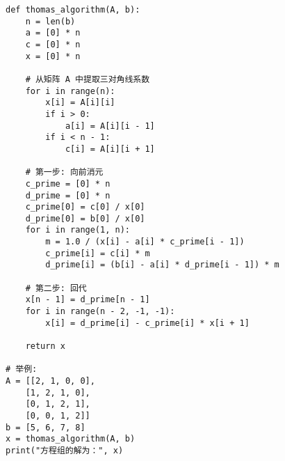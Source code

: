 \documentclass[UTF8,ctexart,a4paper,11pt,openany]{article}
\theoremstyle{definition}
\begin{document}
\begin{lstlisting}[aboveskip=0pt]
def thomas_algorithm(A, b):
    n = len(b)
    a = [0] * n
    c = [0] * n
    x = [0] * n

    # 从矩阵 A 中提取三对角线系数
    for i in range(n):
        x[i] = A[i][i]
        if i > 0:
            a[i] = A[i][i - 1]
        if i < n - 1:
            c[i] = A[i][i + 1]

    # 第一步: 向前消元
    c_prime = [0] * n
    d_prime = [0] * n
    c_prime[0] = c[0] / x[0]
    d_prime[0] = b[0] / x[0]
    for i in range(1, n):
        m = 1.0 / (x[i] - a[i] * c_prime[i - 1])
        c_prime[i] = c[i] * m
        d_prime[i] = (b[i] - a[i] * d_prime[i - 1]) * m

    # 第二步: 回代
    x[n - 1] = d_prime[n - 1]
    for i in range(n - 2, -1, -1):
        x[i] = d_prime[i] - c_prime[i] * x[i + 1]

    return x

# 举例:
A = [[2, 1, 0, 0], 
    [1, 2, 1, 0], 
    [0, 1, 2, 1], 
    [0, 0, 1, 2]]
b = [5, 6, 7, 8]
x = thomas_algorithm(A, b)
print("方程组的解为：", x)

\end{lstlisting}

\clearpage



\end{document}
